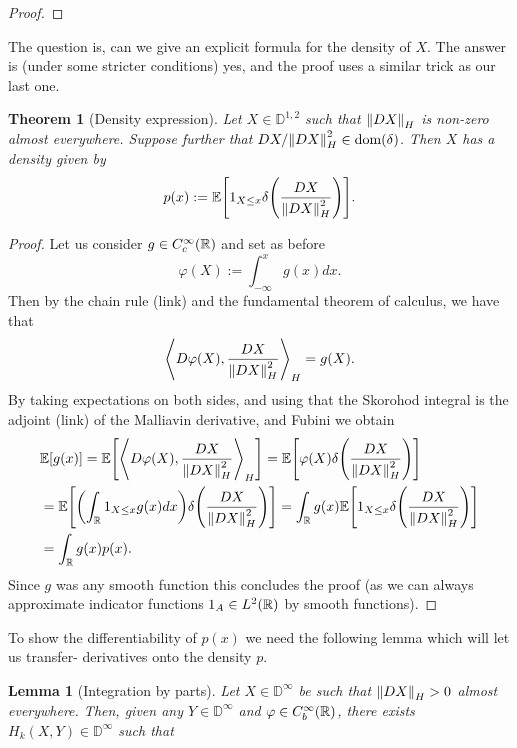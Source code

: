 \documentclass[12pt]{article}
\newtheorem{theorem}{Theorem}
\newtheorem{lemma}{Lemma}
\newcommand{\br}[1]{\left\langle#1\right\rangle}
\begin{document}
\begin{CJK*}{UTF8}{gbsn}
\begin{proof}
	\end{proof}
	The question is, can we give an explicit formula for the density of $X$. The answer is (under some stricter conditions) yes, and the proof uses a similar trick as our last one.
	\begin{theorem}[Density expression]\label{dens exists}
		Let $X\in \mathbb{D}^{1,2}$ such that $\norm{DX}_{H}$ is non-zero almost everywhere. Suppose further that $DX/\norm{DX}^2_{H}\in \text{dom} (\delta )$. Then $X$ has a density given by
		\begin{equation*}
			p(x):=\mathbb{E}\qty[1_{X\leq x}\delta \qty(\frac{DX}{\norm{DX}_{H}^2}) ].
		\end{equation*}
	\end{theorem}
	\begin{proof}
		Let us consider $g\in C_c^\infty({\mathbb R})$ and set as before
		\begin{equation*}
			\varphi(X):=\int_{-\infty}^x g(x)dx.
		\end{equation*}
		Then by the chain rule (link) and the fundamental theorem of calculus, we have that
		\begin{equation*}
			\br{D\varphi(X),\frac{DX}{\norm{DX}^2_{H}}}_{H}=g(X).
		\end{equation*}
		By taking expectations on both sides, and using that the Skorohod integral is the adjoint (link) of the Malliavin derivative, and Fubini we obtain
		\begin{align*}
			 & \E[g(x)]=\E\qty[\br{D\varphi(X),\frac{DX}{\norm{DX}^2_{H}}}_{H}]=\E\qty[\varphi(X)\delta\qty(\frac{DX}{\norm{DX}_{H}^2})]                                 \\
			 & =\E\qty[\qty(\int_{\R}1_{X\leq x} g(x)dx)\delta\qty(\frac{DX}{\norm{DX}^2_{H}})]=\int_{\R}g(x)\E\qty[1_{X\leq x}\delta \qty(\frac{DX}{\norm{DX}_{H}^2}) ] \\&=\int_{\R}g(x)p(x).
		\end{align*}
		Since $g$ was any smooth function this concludes the proof (as we can always approximate indicator functions $1_A\in L^2({\mathbb R})$ by smooth functions).
	\end{proof}
	To show the differentiability of $p(x)$ we need the following lemma which will let us transfer- derivatives onto the density $p$.
	\begin{lemma}[Integration by parts] Let $X\in \mathbb{D}^{\infty}$ be such that $\norm{DX}_{H}>0$ almost everywhere. Then, given any $Y\in \mathbb{D}^\infty $ and $\varphi \in C_b^\infty({\mathbb R})$, there exists $H_{k}(X,Y)\in \mathbb{D}^\infty$ such that

\end{lemma}
\end{CJK*}
\end{document}
